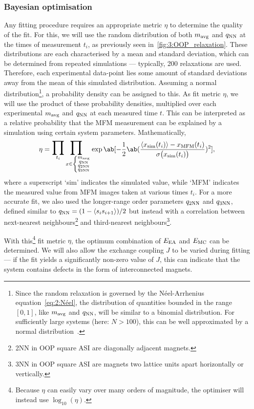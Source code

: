 \subsubsection{Bayesian optimisation}
Any fitting procedure requires an appropriate metric $\eta$ to determine the quality of the fit.
For this, we will use the random distribution of both $\mavg$ and $\qNN$ at the times of measurement $t_i$, as previously seen in~\cref{fig:3:OOP_relaxation}.
These distributions are each characterised by a mean and standard deviation, which can be determined from repeated simulations --- typically, 200 relaxations are used. %
Therefore, each experimental data-point lies some amount of standard deviations away from the mean of this simulated distribution.
Assuming a normal distribution\footnote{
	Since the random relaxation is governed by the N\'eel-Arrhenius equation~\eqref{eq:2:Néel}, the distribution of quantities bounded in the range $[0,1]$, like $\mavg$ and $\qNN$, will be similar to a binomial distribution.
	For sufficiently large systems (here: $N > 100$), this can be well approximated by a normal distribution~\cite{DeMoivreLaplaceTheorem}.
}, a probability density can be assigned to this.
As fit metric $\eta$, we will use the product of these probability densities, multiplied over each experimental $\mavg$ and $\qNN$ at each measured time $t$.
This can be interpreted as a relative probability that the MFM measurement can be explained by a simulation using certain system parameters.
Mathematically,
\begin{equation}
	\eta = \bigprod_{t_i} \bigprod_{x \in \left\{\substack{\mavg\\\qNN\\\qNN[2]\\\qNN[3]}\right.} \exp\ab[-\frac{1}{2} \ab(\frac{\langle x_\mathrm{sim}(t_i) \rangle - x_\mathrm{MFM}(t_i)}{\sigma\big(x_\mathrm{sim}(t_i)\big)})^2] \mathrm{,}
\end{equation}
where a superscript `sim' indicates the simulated value, while `MFM' indicates the measured value from MFM images taken at various times $t_i$.
For a more accurate fit, we also used the longer-range order parameters $\qNN[2]$ and $\qNN[3]$, defined similar to $\qNN = (1 - \langle s_i s_{i+1} \rangle)/2$ but instead with a correlation between next-nearest neighbours\footnote{
	2NN in OOP square ASI are diagonally adjacent magnets.
} and third-nearest neighbours\footnote{
	3NN in OOP square ASI are magnets two lattice units apart horizontally or vertically.
}. \par
With this\footnote{
	Because $\eta$ can easily vary over many orders of magnitude, the optimiser will instead use $\log_{10}(\eta)$.
} fit metric $\eta$, the optimum combination of $\EEA$ and $\EMC$ can be determined.
We will also allow the exchange coupling $J$ to be varied during fitting --- if the fit yields a significantly non-zero value of $J$, this can indicate that the system contains defects in the form of interconnected magnets. \\\par

